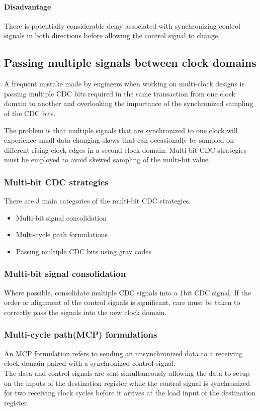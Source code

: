 \paragraph{Disadvantage} There is potentially considerable delay associated with synchronizing control signals in both directions before allowing the control signal to change.


\subsection{Passing multiple signals between clock domains}
A frequent mistake made by engineers when working on multi-clock designs is passing multiple CDC bits required in the same transaction from one clock domain to another and overlooking the importance of the synchronized sampling of the CDC bits.

\par The problem is that multiple signals that are synchronized to one clock will experience small data changing skews that can occasionally be sampled on different rising clock edges in a second clock domain. Multi-bit CDC strategies must be employed to avoid skewed sampling of the multi-bit value.

\subsubsection{Multi-bit CDC strategies}
There are 3 main categories of the multi-bit CDC strategies.
\begin{itemize}
	\item Multi-bit signal consolidation
	\item Multi-cycle path formulations
	\item Passing multiple CDC bits using gray codes
\end{itemize}

\subsubsection{Multi-bit signal consolidation}
Where possible, consolidate multiple CDC signals into a 1bit CDC signal. If the order or alignment of the control signals is significant, care must be taken to correctly pass the signals into the new clock domain.

\subsubsection{Multi-cycle path(MCP) formulations}
An MCP formulation refers to sending an unsynchronized data to a receiving clock domain paired with a synchronized control signal.\\
The data and control signals are sent simultaneously allowing the data to setup on the inputs of the destination register while the control signal is synchronized for two receiving clock cycles before it arrives at the load input of the destination register.
